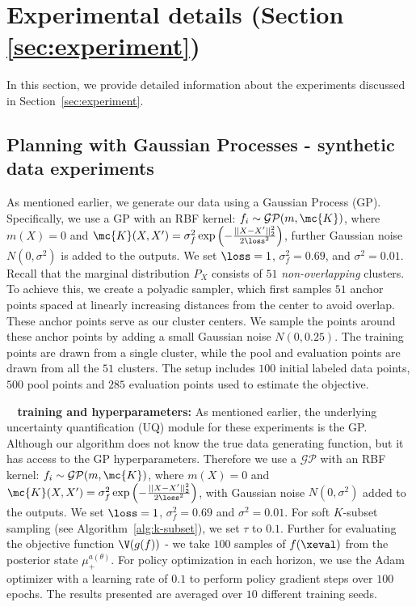 \section{Experimental details (Section \ref{sec:experiment})} \label{sec:details-experiments}

In this section, we provide detailed information about the experiments discussed in Section~\ref{sec:experiment}. 

\subsection{Planning with Gaussian Processes - synthetic data experiments}

As mentioned earlier, we generate our data using a  Gaussian Process ({GP}). Specifically, we use a {GP} with an RBF kernel: $f_i \sim \mathcal{GP}(m,\mc{K}) $, where $m(X)=0$ and $\mc{K}(X,X') = \sigma_f^2 \exp\left(-\frac{||X-X'||_2^2}{2\loss^2}\right)$, further Gaussian   noise $N(0,\sigma^2)$ is added to the outputs. We set $\loss = 1$, $\sigma_f^2 = 0.69$, and $\sigma^2 = 0.01$.
Recall that the marginal distribution $P_X$ consists of $51$ \textit{non-overlapping} clusters. To achieve this, we create a polyadic sampler, which first samples $51$ anchor points spaced at linearly increasing distances from the center to avoid overlap. These anchor points serve as our cluster centers. We sample the points around these anchor points by adding a small Gaussian noise $N(0,0.25)$. The training points are drawn from a single cluster, while the pool and evaluation points are drawn from all the $51$ clusters. The setup includes $100$ initial labeled data points, $500$ pool points and $285$ evaluation points used to estimate the objective. 

\noindent\textbf{\ouralgo~ training and hyperparameters:} As mentioned earlier, the underlying uncertainty quantification (UQ) module for these experiments is the {GP}. Although our algorithm does not know the true data generating function, but it has access to the {GP} hyperparameters. Therefore we use a $\mathcal {GP}$ with an RBF kernel: $f_i \sim \mathcal{GP}(m,\mc{K}) $, where $m(X)=0$ and $\mc{K}(X,X') = \sigma_f^2 \exp\left(-\frac{||X-X'||_2^2}{2\loss^2} \right)$, with 
Gaussian   noise $N(0,\sigma^2)$ added to the outputs. We set $\loss = 1$, $\sigma_f^2 = 0.69$ and $\sigma^2 = 0.01$. For soft $K$-subset sampling  (see Algorithm~\ref{alg:k-subset}),  we set $\tau$ to $0.1$. Further for evaluating the objective function $\V (g(f))$ - we take $100$ samples of $f(\xeval)$ from the posterior state $\mu_+^{a(\theta)}$. 
For policy optimization in each horizon, we use the Adam optimizer with a learning rate of $0.1$ to perform policy gradient steps over $100$ epochs. The results presented are averaged over $10$ different training seeds.


